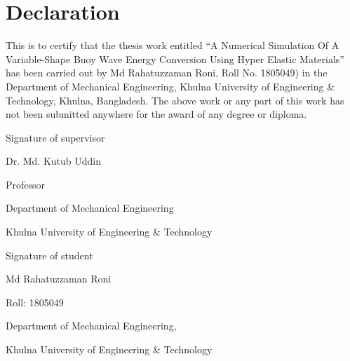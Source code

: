 \documentclass{article}
\begin{document}
\section*{\centering\fontsize{14}{16}\selectfont Declaration}
\vspace{3\baselineskip}
\begin{justify}
{\fontsize{12}{14}\selectfont This is to certify that the thesis work entitled “A Numerical Simulation Of A Variable-Shape Buoy Wave Energy Conversion Using Hyper Elastic Materials” has been carried out by Md Rahatuzzaman Roni, Roll No. 1805049) in the Department of Mechanical Engineering, Khulna University of Engineering \& Technology, Khulna, Bangladesh. The above work or any part of this work has not been submitted anywhere for the award of any degree or diploma.}
\end{justify}

\vspace{3\baselineskip}

\begin{multicols}{2} %
    \centering\fontsize{12}{12}\selectfont %
    \underline{\hspace{0.8\linewidth}}\par %
    Signature of supervisor \par
    \vspace{0.5cm} %
    Dr. Md. Kutub Uddin\par
    Professor\par
    Department of Mechanical Engineering\par
Khulna University of Engineering \& Technology
    
    \columnbreak %
    
    \centering %
    \underline{\hspace{0.8\linewidth}}\par %
    Signature of student\par
    \vspace{0.5cm} %
   \textbf{ }Md Rahatuzzaman Roni \par
   Roll: 1805049\par 
   Department of Mechanical Engineering,\par
   Khulna University of Engineering \& Technology
\end{multicols}
\clearpage
\end{document}
